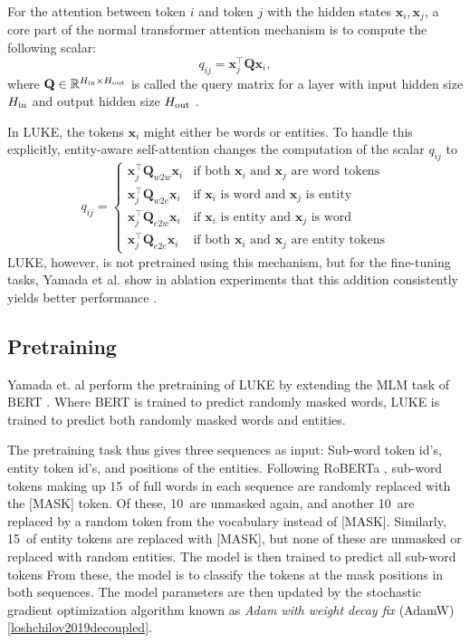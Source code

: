 \documentclass[main.tex]{subfiles}
\begin{document}
For the attention between token $i$ and token $j$ with the hidden states $\mathbf x_i, \mathbf x_j$, a core part of the normal transformer attention mechanism is to compute the following scalar:
\begin{equation}
    q_{ij} = \mathbf x_j^\top \mathbf Q \mathbf x_i,
\end{equation}
where $\mathbf Q\in \mathbb R^{H_\textup{in}\times H_\textup{out}}$ is called the query matrix for a layer with input hidden size $H_\textup{in}$ and output hidden size $H_\textup{out}$ \cite[Sec. 3.2.1]{vaswani2017att}.

In LUKE, the tokens $\mathbf x_i$ might either be words or entities.
To handle this explicitly, entity-aware self-attention changes the computation of the scalar $q_{ij}$ to
\begin{equation}
    q_{ij} = 
    \begin{cases}
    \mathbf x_j^\top \mathbf Q_{w2w} \mathbf x_i  & \text{if both $\mathbf x_i$ and $\mathbf x_j$ are word tokens}\\
    \mathbf x_j^\top \mathbf Q_{w2e} \mathbf x_i & \text{if $\mathbf x_i$ is word and $\mathbf x_j$ is entity}\\
    \mathbf x_j^\top \mathbf Q_{e2w} \mathbf x_i & \text{if $\mathbf x_i$ is entity and $\mathbf x_j$ is word}\\
    \mathbf x_j^\top \mathbf Q_{e2e} \mathbf x_i & \text{if both $\mathbf x_i$ and $\mathbf x_j$ are entity tokens}
    \end{cases}
\end{equation}
LUKE, however, is not pretrained using this mechanism, but for the fine-tuning tasks, Yamada et al. show in ablation experiments that this addition consistently yields better performance \cite[Sec. 5.2]{yamada2020luke}.

\subsection{Pretraining}
Yamada et. al perform the pretraining of LUKE by extending the MLM task of BERT \cite{devlin2019bert}.
Where BERT is trained to predict randomly masked words, LUKE is trained to predict both randomly masked words and entities.

The pretraining task thus gives three sequences as input:
Sub-word token id's, entity token id's, and positions of the entities.
Following RoBERTa \cite{liu2019roberta}, sub-word tokens making up 15\pro\ of full words in each sequence are randomly replaced with the [MASK] token.
Of these, 10\pro\ are unmasked again, and another 10\pro\ are replaced by a random token from the vocabulary instead of [MASK].
Similarly, 15\pro\ of entity tokens are replaced with [MASK], but none of these are unmasked or replaced with random entities.
The model is then trained to predict all sub-word tokens 
From these, the model is to classify the tokens at the mask positions in both sequences.
The model parameters are then updated by the stochastic gradient optimization algorithm known as \emph{Adam with weight decay fix} (AdamW) \ref{loshchilov2019decoupled}.
\end{document}
